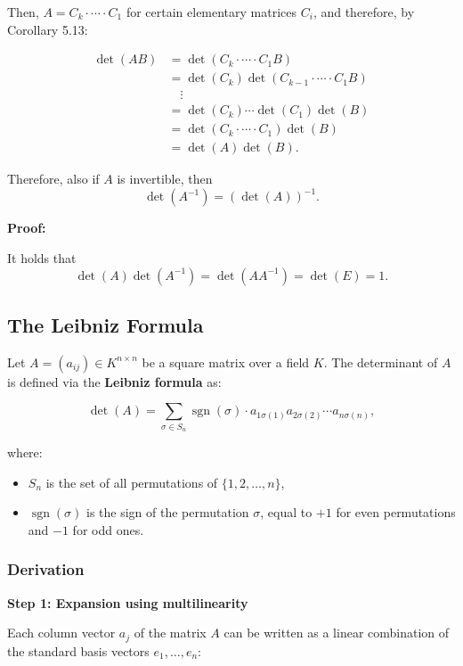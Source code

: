 Then, \( A = C_k \cdot \cdots \cdot C_1 \) for certain elementary matrices \( C_i \), and therefore, by Corollary 5.13:

\begin{align*}
\det(AB) &= \det(C_k \cdot \cdots \cdot C_1 B) \\
&= \det(C_k)\det(C_{k-1} \cdot \cdots \cdot C_1 B) \\
&\quad \vdots \\
&= \det(C_k) \cdots \det(C_1)\det(B) \\
&= \det(C_k \cdot \cdots \cdot C_1)\det(B) \\
&= \det(A)\det(B).
\end{align*}

Therefore, also if \( A \) is invertible, then
\[
\det(A^{-1}) = {(\det(A))}^{-1}.
\]

\textbf{Proof:} 

It holds that
\[
\det(A)\det(A^{-1}) = \det(AA^{-1}) = \det(E) = 1.
\]

\subsection{The Leibniz Formula}

Let \( A = (a_{ij}) \in K^{n \times n} \) be a square matrix over a field \( K \). The determinant of \( A \) is defined via the \textbf{Leibniz formula} as:

\[
\det(A) = \sum_{\sigma \in S_n} \operatorname{sgn}(\sigma) \cdot a_{1\sigma(1)} a_{2\sigma(2)} \cdots a_{n\sigma(n)},
\]

where:
\begin{itemize}
    \item \( S_n \) is the set of all permutations of \( \{1, 2, \dots, n\} \),
    \item \( \operatorname{sgn}(\sigma) \) is the sign of the permutation \( \sigma \), equal to \( +1 \) for even permutations and \( -1 \) for odd ones.
\end{itemize}

\subsubsection{Derivation}

\textbf{Step 1: Expansion using multilinearity}

Each column vector \( a_j \) of the matrix \( A \) can be written as a linear combination of the standard basis vectors \( e_1, \dots, e_n \):

